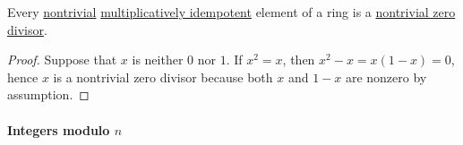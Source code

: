 \begin{proposition}\label{thm:idempotent_division}
  Every \hyperref[def:monoid_idempotent]{nontrivial} \hyperref[def:semiring_idempotent]{multiplicatively idempotent} element of a ring is a \hyperref[def:divisibility/zero]{nontrivial zero divisor}.
\end{proposition}
\begin{proof}
  Suppose that \( x \) is neither \( 0 \) nor \( 1 \). If \( x^2 = x \), then \( x^2 - x = x(1 - x) = 0 \), hence \( x \) is a nontrivial zero divisor because both \( x \) and \( 1 - x \) are nonzero by assumption.
\end{proof}

\paragraph{Integers modulo \( n \)}

